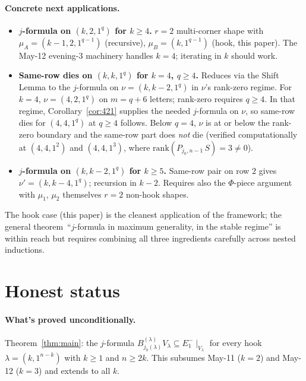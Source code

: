 \documentclass[11pt]{article}
\theoremstyle{definition}
\begin{document}
\paragraph{Concrete next applications.}
\begin{itemize}[leftmargin=2em,topsep=0.2em,itemsep=0.1em]
\item \textbf{$j$-formula on $(k, 2, 1^q)$ for $k \ge 4$.}  $r = 2$
multi-corner shape with $\mu_A = (k-1, 2, 1^{q-1})$ (recursive),
$\mu_B = (k, 1^{q-1})$ (hook, this paper).  The May-12 evening-3
machinery handles $k = 4$; iterating in $k$ should work.
\item \textbf{Same-row dies on $(k, k, 1^q)$ for $k = 4$, $q \ge 4$.}
Reduces via the Shift Lemma to the $j$-formula on
$\nu = (k, k-2, 1^q)$ in $\nu$'s rank-zero regime.  For $k = 4$, $\nu =
(4, 2, 1^q)$ on $m = q + 6$ letters; rank-zero requires
$q \ge 4$.  In that regime, Corollary~\ref{cor:421} supplies the
needed $j$-formula on $\nu$, so same-row dies for $(4, 4, 1^q)$ at
$q \ge 4$ follows.  Below $q = 4$, $\nu$ is at or below the rank-zero
boundary and the same-row part does \emph{not} die (verified
computationally at $(4, 4, 1^2)$ and $(4, 4, 1^3)$,
where $\mathrm{rank}(P_{j_0, n-1}\,S) = 3 \ne 0$).
\item \textbf{$j$-formula on $(k, k-2, 1^q)$ for $k \ge 5$.}  Same-row
pair on row $2$ gives $\nu' = (k, k-4, 1^q)$; recursion in $k - 2$.
Requires also the $\Phi$-piece argument with $\mu_1$, $\mu_2$
themselves $r = 2$ non-hook shapes.
\end{itemize}

The hook case (this paper) is the cleanest application of the
framework; the general theorem~``$j$-formula in maximum generality, in
the stable regime'' is within reach but requires combining all three
ingredients carefully across nested inductions.

\section{Honest status}\label{sec:status}

\paragraph{What's proved unconditionally.}  Theorem~\ref{thm:main}: the
$j$-formula $B^{(\lambda)}_{j_0(\lambda)} V_\lambda \subseteq
E_1^-\!\mid_{V_\lambda}$ for every hook $\lambda = (k, 1^{n-k})$ with
$k \ge 1$ and $n \ge 2k$.  This subsumes May-11 ($k = 2$) and May-12
($k = 3$) and extends to all $k$.
\end{document}
